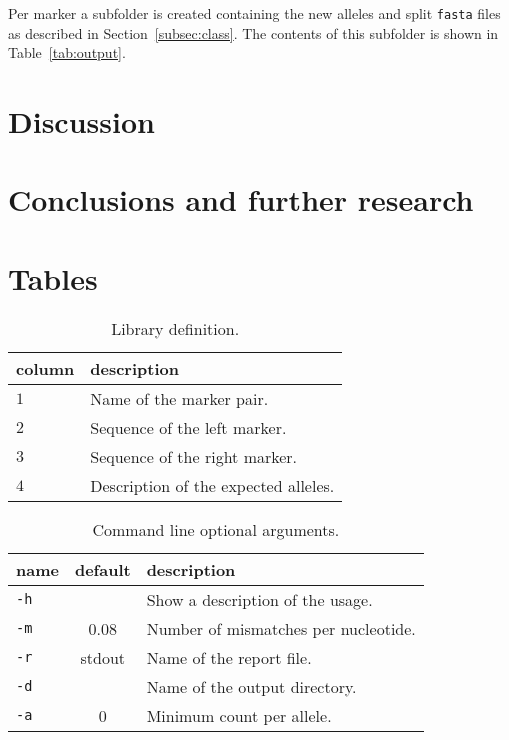 \documentclass{article}
\begin{document}
Per marker a subfolder is created containing the new alleles and split
\texttt{fasta} files as described in Section~\ref{subsec:class}. The contents
of this subfolder is shown in Table~\ref{tab:output}.

\section{Discussion}

\section{Conclusions and further research}

{}


\appendix

\section{Tables}
\begin{table}[h]
  \caption{Library definition.}
  \label{tab:library}
  \begin{center}
    \begin{tabular}{l|l}
      column & description\\
      \hline
      $1$ & Name of the marker pair.\\
      $2$ & Sequence of the left marker.\\
      $3$ & Sequence of the right marker.\\
      $4$ & Description of the expected alleles.\\
    \end{tabular}
  \end{center}
\end{table}

\begin{table}[]
  \caption{Command line optional arguments.}
  \label{tab:args}
  \begin{center}
    \begin{tabular}{l|c|l}
      name & default & description\\
      \hline
      \texttt{-h} &        & Show a description of the usage.\\
      \texttt{-m} & 0.08   & Number of mismatches per nucleotide.\\
      \texttt{-r} & stdout & Name of the report file.\\
      \texttt{-d} &        & Name of the output directory.\\
      \texttt{-a} & 0      & Minimum count per allele.\\
    \end{tabular}
  \end{center}
\end{table}
\end{document}
